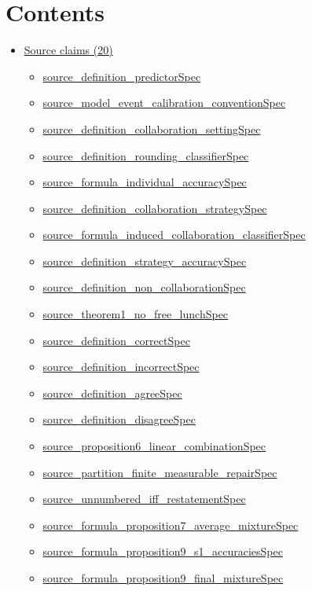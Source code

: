 \documentclass[10pt]{article}
\begin{document}
\section*{Contents}
\begin{itemize}[leftmargin=1.2em]
\item \hyperlink{source-section-f10b5f68e4acf3dc}{Source claims (20)}
\begin{itemize}[leftmargin=1.2em]
\item \hyperlink{source-claim-9384ebab7398c5e4}{source\_definition\_predictorSpec}
\item \hyperlink{source-claim-05c0eaac9818a586}{source\_model\_event\_calibration\_conventionSpec}
\item \hyperlink{source-claim-6ba03b9e70eacd50}{source\_definition\_collaboration\_settingSpec}
\item \hyperlink{source-claim-b8bc36d9b34f3b29}{source\_definition\_rounding\_classifierSpec}
\item \hyperlink{source-claim-9ca4c6ad86e89895}{source\_formula\_individual\_accuracySpec}
\item \hyperlink{source-claim-ca1c9f8cb9fbae0b}{source\_definition\_collaboration\_strategySpec}
\item \hyperlink{source-claim-075776b0c6d0a991}{source\_formula\_induced\_collaboration\_classifierSpec}
\item \hyperlink{source-claim-825d56b262a72a57}{source\_definition\_strategy\_accuracySpec}
\item \hyperlink{source-claim-8acfa10d61ca8cac}{source\_definition\_non\_collaborationSpec}
\item \hyperlink{source-claim-bf0315dd1a18c70e}{source\_theorem1\_no\_free\_lunchSpec}
\item \hyperlink{source-claim-76d57f8e8060f2fd}{source\_definition\_correctSpec}
\item \hyperlink{source-claim-c2574ffc8255a71d}{source\_definition\_incorrectSpec}
\item \hyperlink{source-claim-df70754e8844c37d}{source\_definition\_agreeSpec}
\item \hyperlink{source-claim-b15831d5b4ce3fd5}{source\_definition\_disagreeSpec}
\item \hyperlink{source-claim-bee3bb1dc601f6f9}{source\_proposition6\_linear\_combinationSpec}
\item \hyperlink{source-claim-ca52c024caeea892}{source\_partition\_finite\_measurable\_repairSpec}
\item \hyperlink{source-claim-1b69269ab69dfcc0}{source\_unnumbered\_iff\_restatementSpec}
\item \hyperlink{source-claim-f706fa3b58e00679}{source\_formula\_proposition7\_average\_mixtureSpec}
\item \hyperlink{source-claim-2c1cc7b2a1433aaa}{source\_formula\_proposition9\_s1\_accuraciesSpec}
\item \hyperlink{source-claim-6680595ed06f984e}{source\_formula\_proposition9\_final\_mixtureSpec}
\end{itemize}
\end{itemize}
\end{document}
